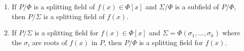 \begin{enumerate}
\item[(1)] If $P/\Phi$ is a splitting field of $f(x) \in \Phi[x]$ and $\Sigma/\Phi$ is a subfield of $P/\Phi$, then $P/\Sigma$ is a splitting field of $f(x)$.
\item[(2)] If $P/\Sigma$ is a splitting field for $f(x) \in \Phi[x]$ and $\Sigma = \Phi(\sigma_1, \ldots, \sigma_k)$ where the $\sigma_i$ are roots of $f(x)$ in $P$, then $P/\Phi$ is a splitting field for $f(x)$.
\end{enumerate}
